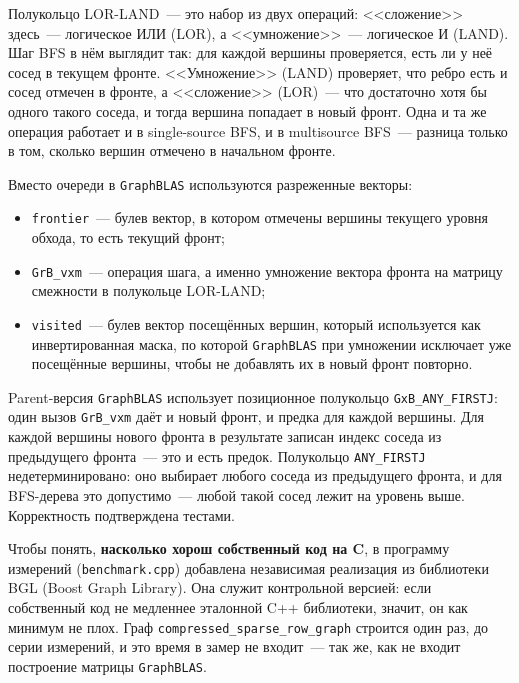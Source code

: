 \documentclass[a4paper]{article}
\begin{document}
Полукольцо LOR-LAND~--- это набор из двух операций: <<сложение>> здесь~--- логическое ИЛИ (LOR), а <<умножение>>~--- логическое И (LAND). Шаг BFS в нём выглядит так: для каждой вершины проверяется, есть ли у неё сосед в текущем фронте. <<Умножение>> (LAND) проверяет, что ребро есть и сосед отмечен в фронте, а <<сложение>> (LOR)~--- что достаточно хотя бы одного такого соседа, и тогда вершина попадает в новый фронт. Одна и та же операция работает и в single-source BFS, и в multisource BFS~--- разница только в том, сколько вершин отмечено в начальном фронте.

Вместо очереди в \texttt{GraphBLAS} используются разреженные векторы:
\begin{itemize}
    \item \texttt{frontier}~--- булев вектор, в котором отмечены вершины текущего уровня обхода, то есть текущий фронт;
    \item \texttt{GrB\_vxm}~--- операция шага, а именно умножение вектора фронта на матрицу смежности в полукольце LOR-LAND;
    \item \texttt{visited}~--- булев вектор посещённых вершин, который используется как инвертированная маска, по которой \texttt{GraphBLAS} при умножении исключает уже посещённые вершины, чтобы не добавлять их в новый фронт повторно.
\end{itemize}

Parent-версия \texttt{GraphBLAS} использует позиционное полукольцо \texttt{GxB\_ANY\_FIRSTJ}: один вызов \texttt{GrB\_vxm} даёт и новый фронт, и предка для каждой вершины. Для каждой вершины нового фронта в результате записан индекс соседа из предыдущего фронта~--- это и есть предок. Полукольцо \texttt{ANY\_FIRSTJ} недетерминировано: оно выбирает любого соседа из предыдущего фронта, и для BFS-дерева это допустимо~--- любой такой сосед лежит на уровень выше. Корректность подтверждена тестами.

Чтобы понять, \textbf{насколько хорош собственный код на C}, в программу измерений (\texttt{benchmark.cpp}) добавлена независимая реализация из библиотеки BGL (Boost Graph Library). Она служит контрольной версией: если собственный код не медленнее эталонной C++ библиотеки, значит, он как минимум не плох. Граф \texttt{compressed\_sparse\_row\_graph} строится один раз, до серии измерений, и это время в замер не входит~--- так же, как не входит построение матрицы \texttt{GraphBLAS}.
\end{document}
